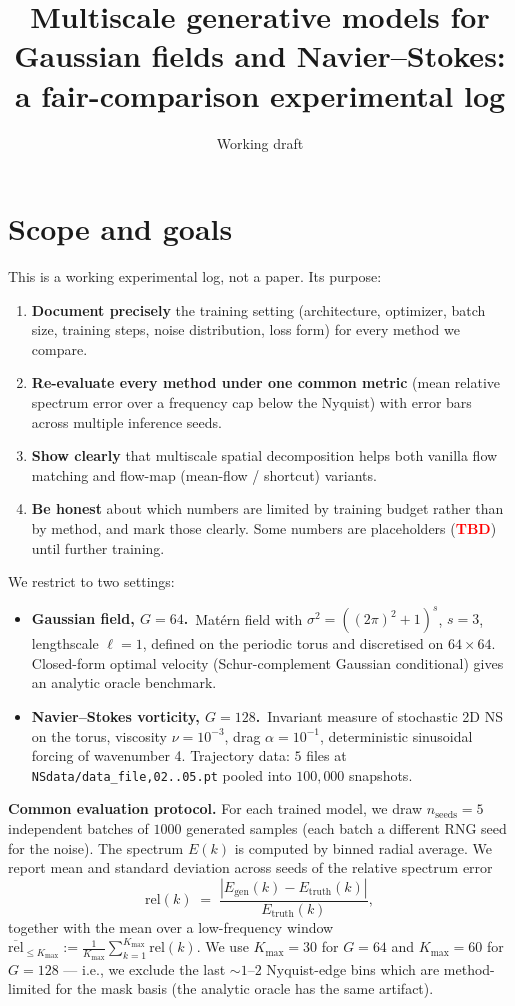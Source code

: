 \documentclass[11pt]{article}
\title{Multiscale generative models for Gaussian fields and Navier–Stokes:\\
a fair-comparison experimental log}
\author{Working draft}
\date{}
\newcommand{\TBD}{\textcolor{red}{\textbf{TBD}}}
\newcommand{\meanrel}{\overline{\text{rel}}}
\begin{document}
\maketitle

\section*{Scope and goals}

This is a working experimental log, not a paper. Its purpose:
\begin{enumerate}
\item \textbf{Document precisely} the training setting (architecture, optimizer, batch size, training steps, noise distribution, loss form) for every method we compare.
\item \textbf{Re-evaluate every method under one common metric} (mean relative spectrum error over a frequency cap below the Nyquist) with error bars across multiple inference seeds.
\item \textbf{Show clearly} that multiscale spatial decomposition helps both vanilla flow matching and flow-map (mean-flow / shortcut) variants.
\item \textbf{Be honest} about which numbers are limited by training budget rather than by method, and mark those clearly. Some numbers are placeholders (\TBD) until further training.
\end{enumerate}

We restrict to two settings:
\begin{itemize}
\item \textbf{Gaussian field, $G=64$.}\ Mat\'ern field with $\sigma^2 = ((2\pi)^2 + 1)^s$, $s=3$, lengthscale $\ell=1$, defined on the periodic torus and discretised on $64\times 64$. Closed-form optimal velocity (Schur-complement Gaussian conditional) gives an analytic oracle benchmark.
\item \textbf{Navier–Stokes vorticity, $G=128$.}\ Invariant measure of stochastic 2D NS on the torus, viscosity $\nu=10^{-3}$, drag $\alpha=10^{-1}$, deterministic sinusoidal forcing of wavenumber 4. Trajectory data: $5$ files at \texttt{NSdata/data\_file{,02..05}.pt} pooled into $100{,}000$ snapshots.
\end{itemize}

\textbf{Common evaluation protocol.} For each trained model, we draw $n_{\text{seeds}}=5$ independent batches of $1000$ generated samples (each batch a different RNG seed for the noise). The spectrum $E(k)$ is computed by binned radial average. We report mean and standard deviation across seeds of the relative spectrum error
\begin{equation}
\text{rel}(k) \;=\; \frac{|E_{\text{gen}}(k) - E_{\text{truth}}(k)|}{E_{\text{truth}}(k)},
\end{equation}
together with the mean over a low-frequency window $\meanrel_{\le K_{\max}} := \tfrac{1}{K_{\max}}\sum_{k=1}^{K_{\max}} \text{rel}(k)$. We use $K_{\max} = 30$ for $G=64$ and $K_{\max}=60$ for $G=128$ — i.e., we exclude the last $\sim 1$--$2$ Nyquist-edge bins which are method-limited for the mask basis (the analytic oracle has the same artifact).
\end{document}
